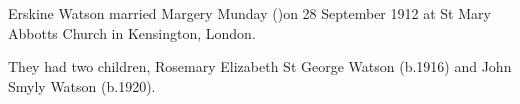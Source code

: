 
Erskine Watson married Margery Munday ()on 28 September 1912 at St Mary Abbotts Church in	Kensington, London.

They had two children, Rosemary Elizabeth St George Watson (b.1916) and John Smyly Watson (b.1920).



